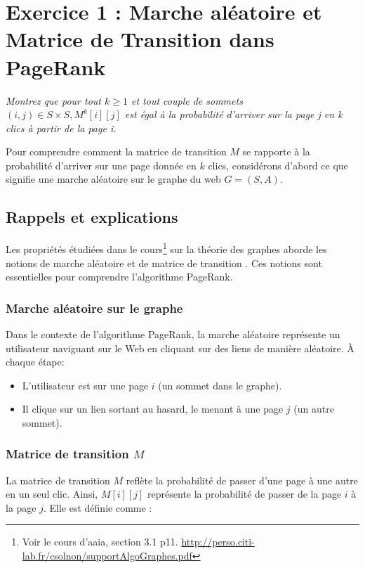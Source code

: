 

\section{Exercice 1 : Marche aléatoire et Matrice de Transition dans PageRank}

\textit{Montrez que pour tout $k \geq 1$ et tout couple de sommets $(i, j) \in S \times S, M^k[i][j]$ est égal à la probabilité d'arriver sur la page j en k clics à partir de la page i.}

Pour comprendre comment la matrice de transition $M$ se rapporte à la probabilité d'arriver sur une page donnée en $k$ clics, considérons d'abord ce que signifie une marche aléatoire sur le graphe du web $G = (S, A)$.

\subsection{Rappels et explications}
Les propriétés étudiées dans le cours\footnote{Voir le cours d'\acrshort{aaia}, section 3.1 p11. \url{http://perso.citi-lab.fr/csolnon/supportAlgoGraphes.pdf}} sur la théorie des graphes aborde les notions de marche aléatoire et de matrice de transition \cite{Solnon2016coursAAIA}. Ces notions sont essentielles pour comprendre l'algorithme PageRank.

\subsubsection{Marche aléatoire sur le graphe}

Dans le contexte de l'algorithme PageRank, la marche aléatoire représente un utilisateur naviguant sur le Web en cliquant sur des liens de manière aléatoire. À chaque étape:
\begin{itemize}
    \item L'utilisateur est sur une page $i$ (un sommet dans le graphe).
    \item Il clique sur un lien sortant au hasard, le menant à une page $j$ (un autre sommet).
\end{itemize}

\subsubsection{Matrice de transition $M$}

La matrice de transition $M$ reflète la probabilité de passer d'une page à une autre en un seul clic. Ainsi, $M[i][j]$ représente la probabilité de passer de la page $i$ à la page $j$. Elle est définie comme :

